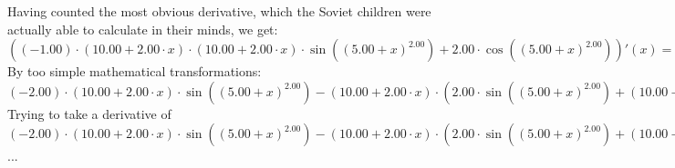 \documentclass{article}
\begin{document}
 \newline
 \newline 
Having counted the most obvious derivative, which the Soviet children were actually able to calculate in their minds, we get:
$({{\left({-1.00}\right) \cdot {\left({{10.00} + {{2.00} \cdot {x}}}\right) \cdot {\left({{10.00} + {{2.00} \cdot {x}}}\right) \cdot  \sin {\left({\left({{5.00} + {x}}\right) ^ {2.00}}\right)} }}} + {{2.00} \cdot  \cos {\left({\left({{5.00} + {x}}\right) ^ {2.00}}\right)} }})'(x) = {{{\left({-2.00}\right) \cdot {\left({{10.00} + {{2.00} \cdot {x}}}\right) \cdot  \sin {\left({\left({{5.00} + {x}}\right) ^ {2.00}}\right)} }} - {\left({{10.00} + {{2.00} \cdot {x}}}\right) \cdot \left({{{2.00} \cdot  \sin {\left({\left({{5.00} + {x}}\right) ^ {2.00}}\right)} } + {\left({{10.00} + {{2.00} \cdot {x}}}\right) \cdot { \cos {\left({\left({{5.00} + {x}}\right) ^ {2.00}}\right)}  \cdot \left({{10.00} + {{2.00} \cdot {x}}}\right)}}}\right)}} - {{2.00} \cdot {\left({{10.00} + {{2.00} \cdot {x}}}\right) \cdot  \sin {\left({\left({{5.00} + {x}}\right) ^ {2.00}}\right)} }}}$\newline
\newline
By too simple mathematical transformations:
 ${{{\left({-2.00}\right) \cdot {\left({{10.00} + {{2.00} \cdot {x}}}\right) \cdot  \sin {\left({\left({{5.00} + {x}}\right) ^ {2.00}}\right)} }} - {\left({{10.00} + {{2.00} \cdot {x}}}\right) \cdot \left({{{2.00} \cdot  \sin {\left({\left({{5.00} + {x}}\right) ^ {2.00}}\right)} } + {\left({{10.00} + {{2.00} \cdot {x}}}\right) \cdot { \cos {\left({\left({{5.00} + {x}}\right) ^ {2.00}}\right)}  \cdot \left({{10.00} + {{2.00} \cdot {x}}}\right)}}}\right)}} - {{2.00} \cdot {\left({{10.00} + {{2.00} \cdot {x}}}\right) \cdot  \sin {\left({\left({{5.00} + {x}}\right) ^ {2.00}}\right)} }}} = {{{\left({-2.00}\right) \cdot {\left({{10.00} + {{2.00} \cdot {x}}}\right) \cdot  \sin {\left({\left({{5.00} + {x}}\right) ^ {2.00}}\right)} }} - {\left({{10.00} + {{2.00} \cdot {x}}}\right) \cdot \left({{{2.00} \cdot  \sin {\left({\left({{5.00} + {x}}\right) ^ {2.00}}\right)} } + {\left({{10.00} + {{2.00} \cdot {x}}}\right) \cdot { \cos {\left({\left({{5.00} + {x}}\right) ^ {2.00}}\right)}  \cdot \left({{10.00} + {{2.00} \cdot {x}}}\right)}}}\right)}} - {{2.00} \cdot {\left({{10.00} + {{2.00} \cdot {x}}}\right) \cdot  \sin {\left({\left({{5.00} + {x}}\right) ^ {2.00}}\right)} }}}$ 
 \newline
 \newline 
Trying to take a derivative of ${{{\left({-2.00}\right) \cdot {\left({{10.00} + {{2.00} \cdot {x}}}\right) \cdot  \sin {\left({\left({{5.00} + {x}}\right) ^ {2.00}}\right)} }} - {\left({{10.00} + {{2.00} \cdot {x}}}\right) \cdot \left({{{2.00} \cdot  \sin {\left({\left({{5.00} + {x}}\right) ^ {2.00}}\right)} } + {\left({{10.00} + {{2.00} \cdot {x}}}\right) \cdot { \cos {\left({\left({{5.00} + {x}}\right) ^ {2.00}}\right)}  \cdot \left({{10.00} + {{2.00} \cdot {x}}}\right)}}}\right)}} - {{2.00} \cdot {\left({{10.00} + {{2.00} \cdot {x}}}\right) \cdot  \sin {\left({\left({{5.00} + {x}}\right) ^ {2.00}}\right)} }}}$...\newline
\end{document}

